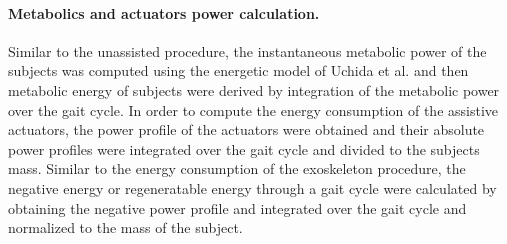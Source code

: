\documentclass[10pt,letterpaper]{article}
\begin{document}
\paragraph*{Metabolics and actuators power calculation.} Similar to the unassisted procedure, the instantaneous metabolic power of the subjects was computed using the energetic model of Uchida et al. \cite{106} and then metabolic energy of subjects were derived by integration of the metabolic power over the gait cycle. In order to compute the energy consumption of the assistive actuators, the power profile of the actuators were obtained and their absolute power profiles were integrated over the gait cycle and divided to the subjects mass. Similar to the energy consumption of the exoskeleton procedure, the negative energy or regeneratable energy through a gait cycle were calculated by obtaining the negative power profile and integrated over the gait cycle and normalized to the mass of the subject.\\
\end{document}
